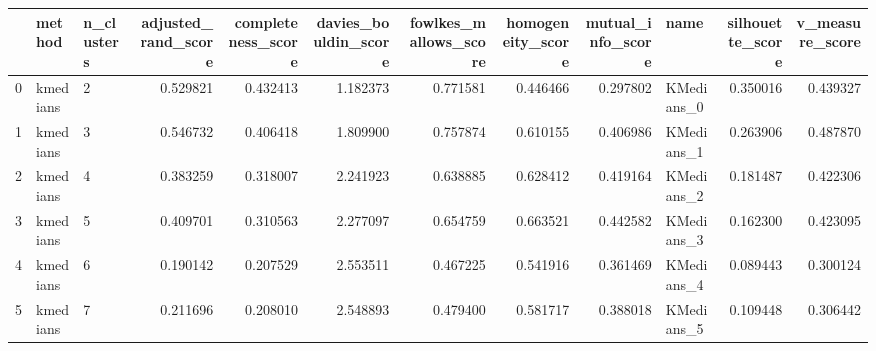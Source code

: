 \begin{tabular}{lllrrrrrrlrr}
\toprule
{} &    method & n\_clusters &  adjusted\_rand\_score &  completeness\_score &  davies\_bouldin\_score &  fowlkes\_mallows\_score &  homogeneity\_score &  mutual\_info\_score &        name &  silhouette\_score &  v\_measure\_score \\
\midrule
0 &  kmedians &          2 &             0.529821 &            0.432413 &              1.182373 &               0.771581 &           0.446466 &           0.297802 &  KMedians\_0 &          0.350016 &         0.439327 \\
1 &  kmedians &          3 &             0.546732 &            0.406418 &              1.809900 &               0.757874 &           0.610155 &           0.406986 &  KMedians\_1 &          0.263906 &         0.487870 \\
2 &  kmedians &          4 &             0.383259 &            0.318007 &              2.241923 &               0.638885 &           0.628412 &           0.419164 &  KMedians\_2 &          0.181487 &         0.422306 \\
3 &  kmedians &          5 &             0.409701 &            0.310563 &              2.277097 &               0.654759 &           0.663521 &           0.442582 &  KMedians\_3 &          0.162300 &         0.423095 \\
4 &  kmedians &          6 &             0.190142 &            0.207529 &              2.553511 &               0.467225 &           0.541916 &           0.361469 &  KMedians\_4 &          0.089443 &         0.300124 \\
5 &  kmedians &          7 &             0.211696 &            0.208010 &              2.548893 &               0.479400 &           0.581717 &           0.388018 &  KMedians\_5 &          0.109448 &         0.306442 \\
\bottomrule
\end{tabular}
